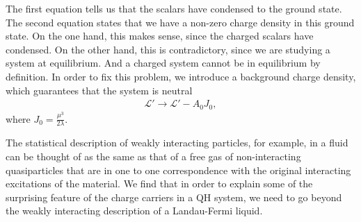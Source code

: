         The first equation tells us that the scalars have condensed to the ground state. The second equation states that we have a non-zero charge density in this ground state. On the one hand, this makes sense, since the charged scalars have condensed. On the other hand, this is contradictory, since we are studying a system at equilibrium. And a charged system cannot be in equilibrium by definition. In order to fix this problem, we introduce a background charge density, which guarantees that the system is neutral 
        \begin{align}
            \mathcal{L}' \rightarrow \mathcal{L}' - A_0 J_0,
        \end{align}
        where $J_0 = \frac{\mu^3}{2\lambda}$.

        The statistical description of weakly interacting particles, for example, in a fluid can be thought of as the same as that of a free gas of non-interacting quasiparticles that are in one to one correspondence with the original interacting excitations of the material. We find that in order to explain some of the surprising feature of the charge carriers in a QH system, we need to go beyond the weakly interacting description of a Landau-Fermi liquid.
